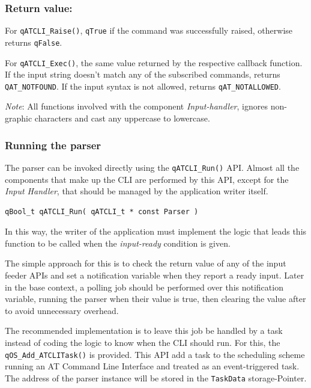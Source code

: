 \documentclass{article}
\begin{document}
\subsubsection*{Return value:}
For \lstinline{qATCLI_Raise()}, \lstinline{qTrue} if the command was successfully raised, otherwise returns \lstinline{qFalse}.

For \lstinline{qATCLI_Exec()}, the same value returned by the respective callback function. If the input string doesn't match any of the subscribed commands, returns \lstinline{QAT_NOTFOUND}. If the input syntax is not allowed, returns \lstinline{qAT_NOTALLOWED}. \\

\begin{tcolorbox}
\ArrowBoldDownRight \textit{Note}: All functions involved with the component \textit{Input-handler},  ignores non-graphic characters and cast any uppercase to lowercase.
\end{tcolorbox}

\subsubsection{Running the parser} \label{runningparser}
The parser can be invoked directly using the \lstinline{qATCLI_Run()}  API. Almost all the components that make up the CLI are performed by this API, except for the \textit{Input Handler}, that should be managed by the application writer itself. \\

\begin{lstlisting}[style=CStyle]
qBool_t qATCLI_Run( qATCLI_t * const Parser )
\end{lstlisting}

In this way, the writer of the application must implement the logic that leads this function to be called when the \textit{input-ready} condition is given.

The simple approach for this is to check the return value of any of the input feeder APIs and set a notification variable when they report a ready input. Later in the base context, a polling job should be performed over this notification variable, running the parser when their value is true, then clearing the value after to avoid unnecessary overhead. 

The recommended implementation is to leave this job be handled by a task instead of coding the logic to know when the CLI should run. For this, the \lstinline{qOS_Add_ATCLITask()} is provided. This API  add a task to the scheduling scheme running an AT Command Line Interface and treated as an event-triggered task. The address of the parser instance will be stored in the \lstinline{TaskData} storage-Pointer. \\
\end{document}
